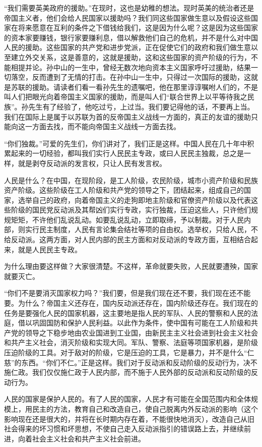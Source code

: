 \documentclass[UTF-8, a5paper, 12pt]{ctexart}
\begin{document}
“我们需要英美政府的援助。”在现时，这也是幼稚的想法。现时英美的统治者还是帝国主义者，他们会给人民国家以援助吗？我们同这些国家做生意以及假设这些国家在将来愿意在互利的条件之下借钱给我们，这是因为什么呢？这是因为这些国家的资本家要赚钱，银行家要赚利息，借以解救他们自己的危机，并不是什么对中国人民的援助。这些国家的共产党和进步党派，正在促使它们的政府和我们做生意以至建立外交关系，这是善意的，这就是援助，这和这些国家的资产阶级的行为，不能相提并论。孙中山的一生中，曾经无数次地向资本主义国家呼吁过援助，结果一切落空，反而遭到了无情的打击。在孙中山一生中，只得过一次国际的援助，这就是苏联的援助。请读者们看一看孙先生的遗嘱吧，他在那里谆谆嘱咐人们的，不是叫人们把眼光向着帝国主义国家的援助，而是叫人们“联合世界上以平等待我之民族”。孙先生有了经验了，他吃过亏，上过当。我们要记得他的话，不要再上当。我们在国际上是属于以苏联为首的反帝国主义战线一方面的，真正的友谊的援助只能向这一方面去找，而不能向帝国主义战线一方面去找。

“你们独裁。”可爱的先生们，你们讲对了，我们正是这样。中国人民在几十年中积累起来的一切经验，都叫我们实行人民民主专政，或曰人民民主独裁，总之是一样，就是剥夺反动派的发言权，只让人民有发言权。

人民是什么？在中国，在现阶段，是工人阶级，农民阶级，城市小资产阶级和民族资产阶级。这些阶级在工人阶级和共产党的领导之下，团结起来，组成自己的国家，选举自己的政府，向着帝国主义的走狗即地主阶级和官僚资产阶级以及代表这些阶级的国民党反动派及其帮凶们实行专政，实行独裁，压迫这些人，只许他们规规矩矩，不许他们乱说乱动。如要乱说乱动，立即取缔，予以制裁。对于人民内部，则实行民主制度，人民有言论集会结社等项的自由权。选举权，只给人民，不给反动派。这两方面，对人民内部的民主方面和对反动派的专政方面，互相结合起来，就是人民民主专政。

为什么理由要这样做？大家很清楚。不这样，革命就要失败，人民就要遭殃，国家就要灭亡。

“你们不是要消灭国家权力吗？”我们要，但是我们现在还不要，我们现在还不能要。为什么？帝国主义还存在，国内反动派还存在，国内阶级还存在。我们现在的任务是要强化人民的国家机器，这主要地是指人民的军队、人民的警察和人民的法庭，借以巩固国防和保护人民利益。以此作为条件，使中国有可能在工人阶级和共产党的领导之下稳步地由农业国进到工业国，由新民主主义社会进到社会主义社会和共产主义社会，消灭阶级和实现大同。军队、警察、法庭等项国家机器，是阶级压迫阶级的工具。对于敌对的阶级，它是压迫的工具，它是暴力，并不是什么“仁慈”的东西。“你们不仁。”正是这样。我们对于反动派和反动阶级的反动行为，决不施仁政。我们仅仅施仁政于人民内部，而不施于人民外部的反动派和反动阶级的反动行为。

人民的国家是保护人民的。有了人民的国家，人民才有可能在全国范围内和全体规模上，用民主的方法，教育自己和改造自己，使自己脱离内外反动派的影响（这个影响现在还是很大的，并将在长时期内存在着，不能很快地消灭），改造自己从旧社会得来的坏习惯和坏思想，不使自己走入反动派指引的错误路上去，并继续前进，向着社会主义社会和共产主义社会前进。
\end{document}

